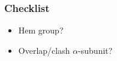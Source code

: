 \documentclass{beamer}
\begin{document}
\begin{frame}
\frametitle{Checklist}
\begin{itemize}
 \item Hem group?
 \item Overlap/clash $\alpha$-subunit?
\end{itemize}
\end{frame}
\begin{comment}


\begin{frame}{Descripción de la aplicación: Proceso electoral}
    \centering
    \begin{figure}
         \subfigure[\tiny Existe un censo (modelo ``Censo'' en models.py)]{\texttt{[image: images/censo0.jpg]}}
         \subfigure[\tiny Mediante el formulario ``CensoForm'' y la vista ``aportarinfo\_censo'' se verifican los datos]
         {\texttt{[image: images/censo-verifica.jpg]}} \\
         \subfigure[\tiny Se vota (VotoForm-aportarinfo\_voto)]{\texttt{[image: images/voto.jpg]}}
         \subfigure[\tiny utils (list-getvotos-/delete-delvoto-/create-testdb-)]{\texttt{[image: images/utils.png]}}
     \end{figure}
\end{frame}

\begin{frame}
\frametitle{Desacoplar Servidor y cliente - I (P1-base)}
    \begin{figure}
        \centering
        \texttt{[image: images/back-front-1.png]}
    \end{figure}
\end{frame}

\begin{frame}
\frametitle{Desacoplar Servidor y cliente - II}
    \begin{figure}
        \centering
        \texttt{[image: images/back-front-2.jpg]}
    \end{figure}
\end{frame}



\begin{frame}
\frametitle{Backend-Frontend (SI2)}
\tikzstyle{startstop} = [rectangle, rounded corners, minimum width=3cm, minimum height=1cm,text centered, draw=black, fill=red!30]
\centering
\begin{tikzpicture}[node distance=2cm]
    \node (vuejs) [startstop] {Django Server - I (Backend)};
    \node (serve) [startstop, below of=vuejs] {Browser (Django Frontend)};
    \node (apirest) [startstop, right of=vuejs, xshift=4cm] {API REST - Django Server - II};


\end{comment}
\end{document}
